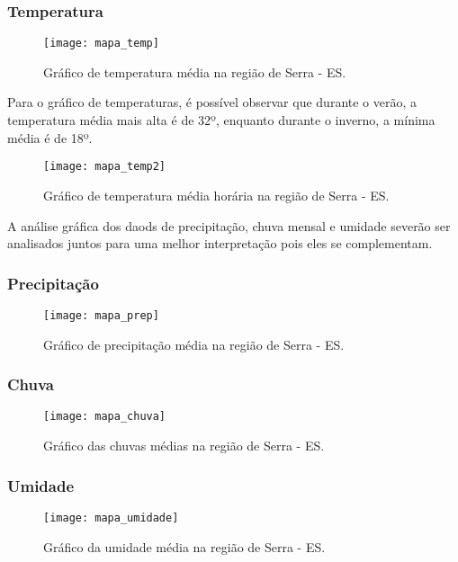 \subsubsection{Temperatura}

\begin{figure}[!h]
	\texttt{[image: mapa\_temp]}
	\centering
	\caption{Gráfico de temperatura média na região de Serra - ES.}
\end{figure}

Para o gráfico de temperaturas, é possível observar que durante o verão, a temperatura média mais alta é de 32º, enquanto durante o inverno, a mínima média é de 18º. 

\begin{figure}[!h]
	\texttt{[image: mapa\_temp2]}
	\centering
	\caption{Gráfico de temperatura média horária na região de Serra - ES.}
\end{figure}

A análise gráfica dos daods de precipitação, chuva mensal e umidade severão ser analisados juntos para uma melhor interpretação pois eles se complementam.

\subsubsection{Precipitação}

\begin{figure}[!h]
	\texttt{[image: mapa\_prep]}
	\centering
	\caption{Gráfico de precipitação média na região de Serra - ES.}
	\label{mapa_prep}
\end{figure}

\subsubsection{Chuva}
\begin{figure}[!h]
	\texttt{[image: mapa\_chuva]}
	\centering
	\caption{Gráfico das chuvas médias na região de Serra - ES.}
	\label{mapa_chuva}
\end{figure}
\subsubsection{Umidade}
\begin{figure}[!h]
	\texttt{[image: mapa\_umidade]}
	\centering
	\caption{Gráfico da umidade média na região de Serra - ES.}
	\label{mapa_umidade}
\end{figure}

